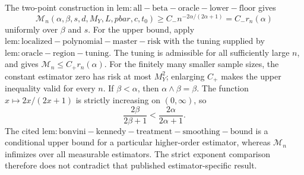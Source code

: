 The two-point construction in \(\mathrm{lem:all-beta-oracle-lower-floor}\) gives
\[
\mathcal M_n(\alpha,\beta,s,d,M_Y,L,pbar,c,t_0)
\ge C_-n^{-2\alpha/(2\alpha+1)}=C_-r_n(\alpha)
\]
uniformly over \(\beta\) and \(s\).  For the upper bound, apply \(\mathrm{lem:localized-polynomial-master-risk}\) with the tuning supplied by \(\mathrm{lem:oracle-region-tuning}\).  The tuning is admissible for all sufficiently large \(n\), and gives \(\mathcal M_n\le C_+r_n(\alpha)\).  For the finitely many smaller sample sizes, the constant estimator zero has risk at most \(M_Y^2\); enlarging \(C_+\) makes the upper inequality valid for every \(n\).  If \(\beta<\alpha\), then \(\alpha\wedge\beta=\beta\).  The function \(x\mapsto2x/(2x+1)\) is strictly increasing on \((0,\infty)\), so
\[
\frac{2\beta}{2\beta+1}<\frac{2\alpha}{2\alpha+1}.
\]
The cited \(\mathrm{lem:bonvini-kennedy-treatment-smoothing-bound}\) is a conditional upper bound for a particular higher-order estimator, whereas \(\mathcal M_n\) infimizes over all measurable estimators.  The strict exponent comparison therefore does not contradict that published estimator-specific result.